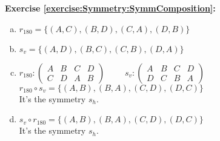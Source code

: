 \noindent\textbf{Exercise \ref{exercise:Symmetry:SymmComposition}:}
\begin{enumerate}[(a)]
\item
$r_{180} = \{(A, C), (B, D), (C, A), (D, B)\}$

\item
$s_v = \{(A, D), (B, C), (C, B), (D, A)\}$

\item 
$r_{180}: \begin{pmatrix}
A & B & C & D\\
C & D & A & B
\end{pmatrix}$
$\qquad s_v: \begin{pmatrix}
A & B & C & D\\
D & C & B & A
\end{pmatrix}$\\
$r_{180}\circ s_v = \{(A,B), (B,A), (C,D), (D,C)\}$\\
It's the symmetry $s_h$.

\item
$s_v\circ r_{180}= \{(A,B), (B,A), (C,D), (D,C)\}$\\
It's the symmetry $s_h$.
\end{enumerate}

